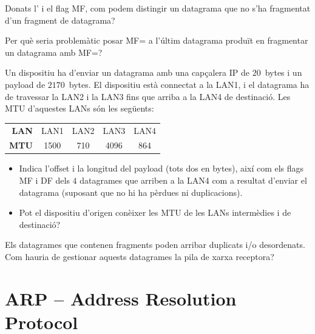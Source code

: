 \begin{exercise}
Donats l' i el flag MF, com podem distingir
un datagrama que no s'ha fragmentat d'un fragment de datagrama?
\end{exercise}

\begin{exercise}
Per què seria problemàtic posar MF= a l'últim datagrama 
produït en fragmentar un datagrama amb MF=?
\end{exercise}

\begin{exercise}
Un dispositiu ha d'enviar un datagrama amb una capçalera IP de $20$~bytes i un payload de $2170$~bytes.
El dispositiu està connectat a la LAN1, i el datagrama ha de travessar 
la LAN2 i la LAN3 fins que arriba a la LAN4 de destinació. Les MTU d'aquestes LANs són les següents:
\begin{center}
\begin{tabular}{r cccc}
\toprule
\textbf{LAN} & LAN1 & LAN2 & LAN3 & LAN4 \\
\textbf{MTU} & 1500 & 710  & 4096 & 864  \\
\bottomrule
\end{tabular}
\end{center}

\begin{itemize}
\item Indica l'offset i la longitud del payload (tots dos en bytes),
 així com els flags MF i DF dels $4$ datagrames
 que arriben a la LAN4 com a resultat d'enviar el datagrama
 (suposant que no hi ha pèrdues ni duplicacions).
  
\item Pot el dispositiu d'origen conèixer les MTU de les LANs intermèdies i de 
destinació?
\end{itemize}

\end{exercise}


\begin{exercise}
Els datagrames que contenen fragments poden arribar duplicats i/o desordenats. 
Com hauria de gestionar aquests datagrames la pila de xarxa receptora?
\end{exercise}


\section{ARP -- Address Resolution Protocol}\label{sec:layer3:arp}

